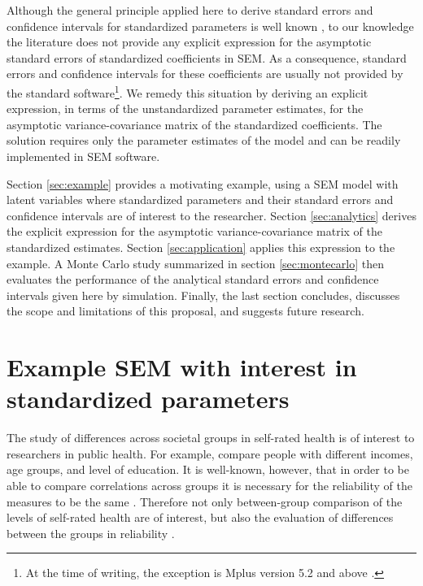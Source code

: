 \documentclass[a4paper,11pt]{article}
\newcommand{\0}{\boldsymbol{0}}
\begin{document}
Although the general principle applied here to derive standard errors and confidence intervals for standardized parameters is well known  \citep[e.g.][]{oehlert1992note}, to our knowledge the literature does not provide any explicit expression for the asymptotic standard errors of standardized coefficients in SEM. As a consequence, standard errors and confidence intervals for these coefficients are usually not provided by the standard software\footnote{At the time of writing, the exception is Mplus version 5.2 and above \citep{muthen1998mplus}.}.  We remedy this situation by deriving an explicit expression, in terms of the unstandardized parameter estimates, for the asymptotic variance-covariance matrix of the standardized coefficients. The solution requires only the parameter estimates of the model and can be readily implemented in SEM software.

Section \ref{sec:example}  provides a motivating example, using a SEM model with latent
variables where standardized parameters and their standard errors and confidence
intervals are of interest to the researcher.
Section \ref{sec:analytics} derives the explicit expression for the asymptotic variance-covariance matrix of the standardized estimates. Section \ref{sec:application} applies this expression to the example. A Monte Carlo study summarized in section \ref{sec:montecarlo}
then evaluates the performance of the analytical standard errors and confidence intervals given here 
by simulation.
Finally, the last section concludes, discusses the scope and limitations of this proposal, and suggests future research.


\section{Example SEM with interest in standardized parameters\label{sec:example}}


The study of differences across societal groups in self-rated health is of interest to researchers in public health.   For example,  \cite{von2006education} 
compare people with different incomes, age groups, and level of education.
It is well-known, however, that in order to be able to compare correlations across groups it is necessary for the reliability of 
the measures to be the same \citep[e.g.][]{steenkamp1998assessing,saris_design_2007}. Therefore not only between-group comparison of the levels of self-rated health are of interest, 
but also the evaluation of differences between the groups in reliability \citep{lundberg1996assessing}. 
\end{document}
